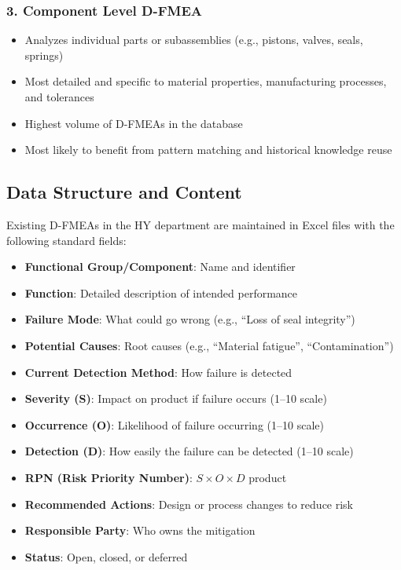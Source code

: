 \subsubsection*{3. Component Level D-FMEA}
\begin{itemize}
    \item Analyzes individual parts or subassemblies (e.g., pistons, valves, seals, springs)
    \item Most detailed and specific to material properties, manufacturing processes, and tolerances
    \item Highest volume of D-FMEAs in the database
    \item Most likely to benefit from pattern matching and historical knowledge reuse
\end{itemize}

\subsection*{Data Structure and Content}

Existing D-FMEAs in the HY department are maintained in Excel files with the following standard fields:

\begin{itemize}
    \item \textbf{Functional Group/Component}: Name and identifier
    \item \textbf{Function}: Detailed description of intended performance
    \item \textbf{Failure Mode}: What could go wrong (e.g., ``Loss of seal integrity'')
    \item \textbf{Potential Causes}: Root causes (e.g., ``Material fatigue'', ``Contamination'')
    \item \textbf{Current Detection Method}: How failure is detected
    \item \textbf{Severity (S)}: Impact on product if failure occurs (1--10 scale)
    \item \textbf{Occurrence (O)}: Likelihood of failure occurring (1--10 scale)
    \item \textbf{Detection (D)}: How easily the failure can be detected (1--10 scale)
    \item \textbf{RPN (Risk Priority Number)}: $S \times O \times D$ product
    \item \textbf{Recommended Actions}: Design or process changes to reduce risk
    \item \textbf{Responsible Party}: Who owns the mitigation
    \item \textbf{Status}: Open, closed, or deferred
\end{itemize}

